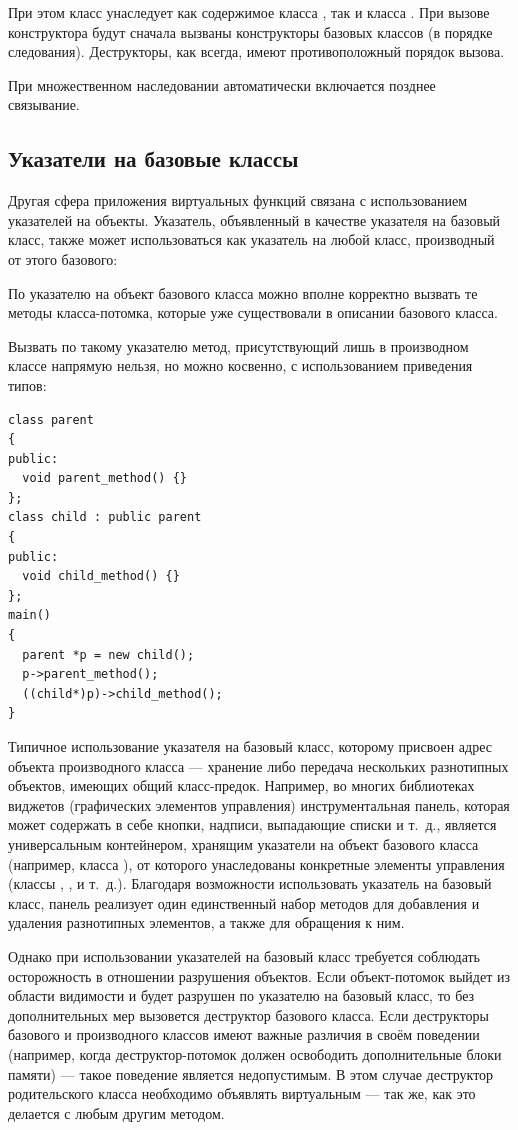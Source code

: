 При этом класс  унаследует как содержимое класса , так и класса
. При вызове конструктора будут сначала вызваны конструкторы базовых классов (в порядке
следования). Деструкторы, как всегда, имеют противоположный порядок вызова.

При множественном наследовании автоматически включается позднее связывание.

\subsection[Указатели на базовые классы]{Указатели на базовые классы}
Другая сфера приложения виртуальных функций связана с использованием указателей на объекты. Указатель, объявленный в
качестве указателя на базовый класс, также может использоваться как указатель на любой класс, производный от этого
базового:


По указателю на объект базового класса можно вполне корректно вызвать те методы класса-потомка, которые уже существовали
в описании базового класса. 

Вызвать по такому указателю метод, присутствующий лишь в производном классе напрямую нельзя, но можно косвенно, с
использованием приведения типов:
\begin{lstlisting}
class parent 
{
public:
  void parent_method() {}
};
class child : public parent 
{
public:
  void child_method() {}
};
main() 
{
  parent *p = new child();
  p->parent_method();
  ((child*)p)->child_method();
} 
\end{lstlisting}

Типичное использование указателя на базовый класс, которому присвоен адрес объекта производного класса --- хранение либо
передача нескольких разнотипных объектов, имеющих общий класс-предок. Например, во многих библиотеках виджетов
(графических элементов управления) инструментальная панель, которая  может содержать в себе кнопки, надписи, выпадающие
списки и т.~д., является универсальным контейнером, хранящим указатели на объект базового класса (например, класса
),  от которого унаследованы конкретные элементы управления (классы
, ,  и т.~д.). Благодаря возможности
использовать указатель на базовый класс, панель реализует один единственный набор методов для добавления и удаления
разнотипных элементов, а также для обращения к ним.

Однако при использовании указателей на базовый класс требуется соблюдать осторожность в отношении разрушения объектов.
Если объект-потомок выйдет из области видимости и будет разрушен по указателю на базовый класс, то без дополнительных
мер вызовется деструктор базового класса. Если деструкторы базового и производного классов имеют важные различия в
своём поведении (например, когда деструктор-потомок должен освободить дополнительные блоки памяти) --- такое поведение
является недопустимым. В этом случае деструктор родительского класса необходимо объявлять виртуальным --- так же, как это
делается с любым другим методом.

